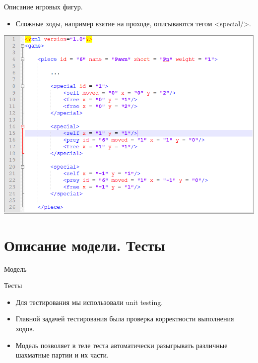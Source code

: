 \documentclass[11pt,slides,aspectratio=43]{beamer}
\begin{document}
    \begin{frame}{Описание игровых фигур.}
		\begin{block}{}
            \begin{itemize}
	           \item Сложные ходы, например взятие на проходе, описываются тегом <special/>.
            \end{itemize}
            \begin{center}
			     \includegraphics[scale=0.33]{special.png}
		    \end{center}
		\end{block}
	\end{frame}

    \section{Описание модели. Тесты}

     \begin{frame}{Модель}
	
	\end{frame}

    \begin{frame}{Тесты}
		\begin{itemize}
	           \item Для тестирования мы использовали unit testing.
               \item Главной задачей тестирования была проверка корректности выполнения ходов.
               \item Модель позволяет в теле теста автоматически разыгрывать различные шахматные партии и их части.
        \end{itemize}
	\end{frame}
\end{document}
